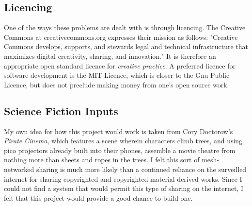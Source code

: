 \subsection{Licencing}
One of the ways these problems are dealt with is through licencing. The Creative Commons at creativecommons.org expresses their mission as follows: "Creative Commons develops, supports, and stewards legal and technical infrastructure that maximizes digital creativity, sharing, and innovation." It is therefore an appropriate open standard licence for \textit{creative practice}. A preferred licence for software development is the MIT Licence, which is closer to the Gnu Public Licence, but does not preclude making money from one's open source work.

\subsection{Science Fiction Inputs}
My own idea for how this project would work is taken from Cory Doctorow's \textit{Pirate Cinema}, which features a scene wherein characters climb trees, and using pico projectors already built into their phones, assemble a movie theatre from nothing more than sheets and ropes in the trees. I felt this sort of mesh-networked sharing is much more likely than a continued reliance on the surveilled internet for sharing copyrighted and copyrighted-material derived works. Since I could not find a system that would permit this type of sharing on the internet, I felt that this project would provide a good chance to build one.